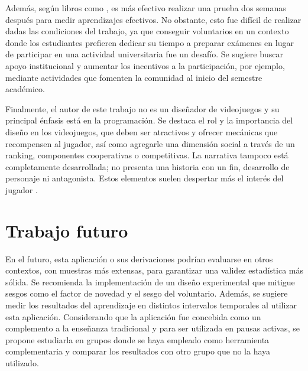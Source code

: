 Además, según libros como \cite{Rogers2002InteractionDesign}, es más efectivo realizar una prueba dos semanas después para medir aprendizajes efectivos. No obstante, esto fue difícil de realizar dadas las condiciones del trabajo, ya que conseguir voluntarios en un contexto donde los estudiantes prefieren dedicar su tiempo a preparar exámenes en lugar de participar en una actividad universitaria fue un desafío. Se sugiere buscar apoyo institucional y aumentar los incentivos a la participación, por ejemplo, mediante actividades que fomenten la comunidad al inicio del semestre académico.

Finalmente, el autor de este trabajo no es un diseñador de videojuegos y su principal énfasis está en la programación. Se destaca el rol y la importancia del diseño en los videojuegos, que deben ser atractivos y ofrecer mecánicas que recompensen al jugador, así como agregarle una dimensión social a través de un ranking, componentes cooperativas o competitivas. La narrativa tampoco está completamente desarrollada; no presenta una historia con un fin, desarrollo de personaje ni antagonista. Estos elementos suelen despertar más el interés del jugador \cite{Zea2014ModelingST, FrangoSilveira2019BuildingEN}.


\section{Trabajo futuro}



En el futuro, esta aplicación o sus derivaciones podrían evaluarse en otros contextos, con muestras más extensas, para garantizar una validez estadística más sólida. Se recomienda la implementación de un diseño experimental que mitigue sesgos como el factor de novedad y el sesgo del voluntario. Además, se sugiere medir los resultados del aprendizaje en distintos intervalos temporales al utilizar esta aplicación. Considerando que la aplicación fue concebida como un complemento a la enseñanza tradicional y para ser utilizada en pausas activas, se propone estudiarla en grupos donde se haya empleado como herramienta complementaria y comparar los resultados con otro grupo que no la haya utilizado.

